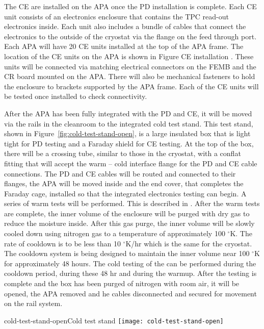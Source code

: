 The CE are installed on the APA once the PD installation is complete.  Each CE unit consists of an electronics enclosure that contains the TPC read-out electronics inside.  Each unit also includes a bundle of cables that connect the electronics to the outside of the cryostat via the flange on the feed through port.  Each APA will have 20 CE units installed at the top of the APA frame.  The location of the CE units on the APA is shown in Figure CE installation .  These units will be connected via matching electrical connectors on the FEMB and the CR board mounted on the APA.  There will also be mechanical fasteners to hold the enclosure to brackets supported by the APA frame.  Each of the CE units will be tested once installed to check connectivity.  

After the APA has been fully integrated with the PD and CE, it will be moved via the rails in the cleanroom to the integrated cold test stand.  This test stand, shown in Figure~\ref{fig:cold-test-stand-open}, is a large insulated box that is light tight for PD testing and a Faraday shield for CE testing.  At the top of the box, there will be a crossing tube, similar to those in the cryostat, with a conflat fitting that will accept the warm – cold interface flange for the PD and CE cable connections.  The PD and CE cables will be routed and connected to their flanges, the APA will be moved inside and the end cover, that completes the Faraday cage, installed so that the integrated electronics testing can begin.  A series of warm tests will be performed.  This is described in .  
After the warm tests are complete, the inner volume of the enclosure will be purged with dry gas to reduce the moisture inside.  After this gas purge, the inner volume will be slowly cooled down using nitrogen gas to a temperature of approximately 100 $^\circ$K.  The rate of cooldown is to be less than 10 $^\circ$K/hr which is the same for the cryostat.  The cooldown system is being designed to maintain the inner volume near 100 $^\circ$K for approximately 48 hours.  The cold testing of the can be performed during the cooldown period, during these 48 hr and during the warmup.  After the testing is complete and the box has been purged of nitrogen with room air, it will be opened, the APA removed and he cables disconnected and secured for movement on the rail system.   

\begin{cdrfigure}{cold-test-stand-open}{Cold test stand }
\texttt{[image: cold-test-stand-open]}
\end{cdrfigure}

